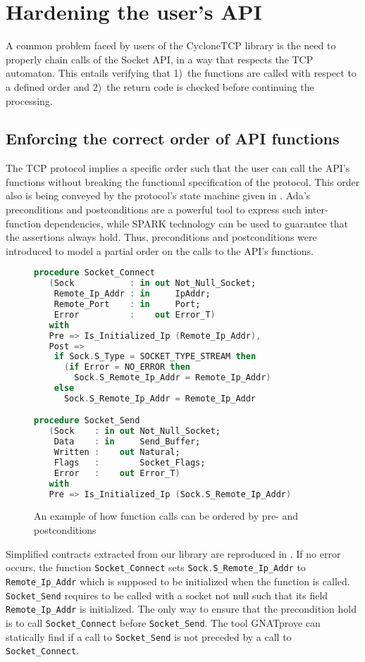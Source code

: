 \documentclass[conference]{IEEEtran}
\def\spark#1{\lstinline[language=Ada]{#1}}
\begin{document}
\section{Hardening the user's API}
\label{sec:API}

A common problem faced by users of the CycloneTCP library is the need to
properly chain calls of the Socket API, in a way that respects the TCP
automaton. This entails verifying that 1)~the functions are called with respect
to a defined order and 2)~the return code is checked before continuing the
processing.

\subsection{Enforcing the correct order of API functions}

The TCP protocol implies a specific order such that the user can call the API's
functions without breaking the functional specification of the protocol. This
order also is being conveyed by the protocol's state machine given in
.
Ada's preconditions and postconditions are a powerful tool to express such inter-function
dependencies, while SPARK technology can be used to guarantee that the
assertions always hold. Thus, preconditions and postconditions were introduced to model
a partial order on the calls to the API's functions.

\begin{figure}
\begin{lstlisting}[language=Ada,basicstyle=\footnotesize\ttfamily]
procedure Socket_Connect
   (Sock           : in out Not_Null_Socket;
    Remote_Ip_Addr : in     IpAddr;
    Remote_Port    : in     Port;
    Error          :    out Error_T)
   with
   Pre => Is_Initialized_Ip (Remote_Ip_Addr),
   Post =>
    if Sock.S_Type = SOCKET_TYPE_STREAM then
      (if Error = NO_ERROR then
        Sock.S_Remote_Ip_Addr = Remote_Ip_Addr)
    else
      Sock.S_Remote_Ip_Addr = Remote_Ip_Addr

procedure Socket_Send
   (Sock    : in out Not_Null_Socket;
    Data    : in     Send_Buffer;
    Written :    out Natural;
    Flags   :        Socket_Flags;
    Error   :    out Error_T)
   with
   Pre => Is_Initialized_Ip (Sock.S_Remote_Ip_Addr)
\end{lstlisting}
\caption{An example of how function calls can be ordered by pre- and
postconditions}
\label{fig:functionorder}
\end{figure}

Simplified contracts extracted from our library are reproduced in
. If no error occurs, the function
\spark{Socket_Connect} sets \spark{Sock.S_Remote_Ip_Addr} to
\spark{Remote_Ip_Addr} which is supposed to be
initialized when the function is called. \spark{Socket_Send} requires to be
called with a socket not null such that its field \spark{Remote_Ip_Addr} is
initialized. The only way to ensure that the precondition hold is to
call \spark{Socket_Connect} before \spark{Socket_Send}.
The tool GNATprove can statically find if a call to \spark{Socket_Send}
is not preceded by a call to \spark{Socket_Connect}.
\end{document}
